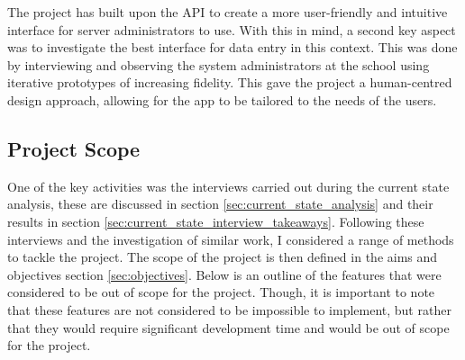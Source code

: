 \documentclass [11pt,a4paper]{article}
\begin{document}
The project has built upon the API to create a more user-friendly and intuitive interface for server administrators to use. With this in mind, a second key aspect was to investigate the best interface for data entry in this context. This was done by interviewing and observing the system administrators at the school using iterative prototypes of increasing fidelity. This gave the project a human-centred design approach, allowing for the app to be tailored to the needs of the users.

\subsection{Project Scope}
\label{sec:project_scope}
One of the key activities was the interviews carried out during the current state analysis, these are discussed in section \ref{sec:current_state_analysis} and their results in section \ref{sec:current_state_interview_takeaways}. Following these interviews and the investigation of similar work, I considered a range of methods to tackle the project. The scope of the project is then defined in the aims and objectives section \ref{sec:objectives}. Below is an outline of the features that were considered to be out of scope for the project. Though, it is important to note that these features are not considered to be impossible to implement, but rather that they would require significant development time and would be out of scope for the project. 
\end{document}
